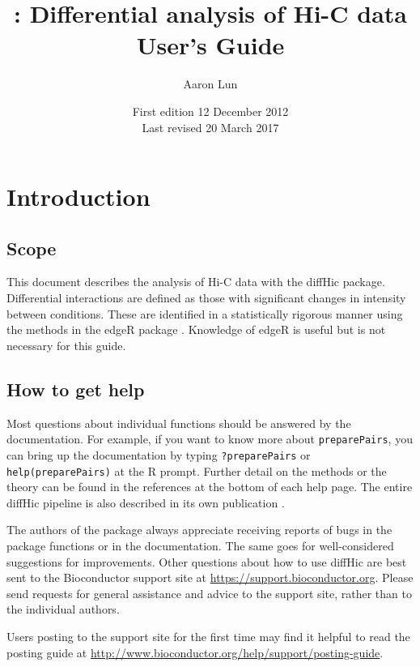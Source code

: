 \documentclass[12pt]{report}
\title{\pkgname{}: Differential analysis of Hi-C data \\ \vspace{0.2in} User's Guide}
\author{Aaron Lun}
\date{First edition 12 December 2012\\
\vspace{6pt}
Last revised 20 March 2017}
\newcommand{\edgeR}{edgeR}
\newcommand{\pkgname}{diffHic}
\newcommand{\code}[1]{{\small\texttt{#1}}}
\newcommand{\R}{\textsf{R}}
\begin{document}
\maketitle
\tableofcontents


\newpage

\chapter{Introduction}
\section{Scope}
This document describes the analysis of Hi-C data with the \pkgname{} package.
Differential interactions are defined as those with significant changes in intensity between conditions.
These are identified in a statistically rigorous manner using the methods in the \edgeR{} package \citep{edgeR}.
Knowledge of \edgeR{} is useful but is not necessary for this guide.

\section{How to get help}
Most questions about individual functions should be answered by the documentation.
For example, if you want to know more about \code{preparePairs}, you can bring up the documentation by typing \code{?preparePairs} or \code{help(preparePairs)} at the \R{} prompt.
Further detail on the methods or the theory can be found in the references at the bottom of each help page.
The entire \pkgname{} pipeline is also described in its own publication \citep{lun2015diffhic}.

The authors of the package always appreciate receiving reports of bugs in the package functions or in the documentation. 
The same goes for well-considered suggestions for improvements. 
Other questions about how to use \pkgname{} are best sent to the Bioconductor support site at \url{https://support.bioconductor.org}.
Please send requests for general assistance and advice to the support site, rather than to the individual authors. 

Users posting to the support site for the first time may find it helpful to read the posting guide at \url{http://www.bioconductor.org/help/support/posting-guide}.
\end{document}

